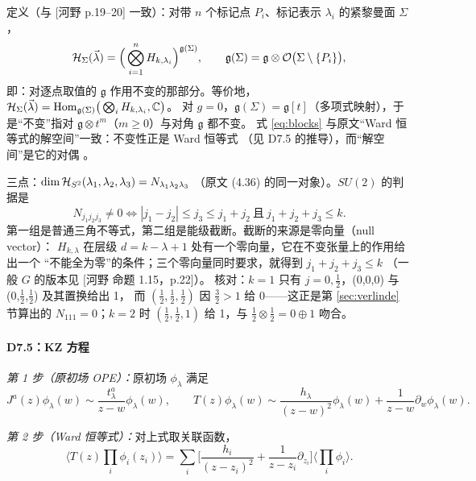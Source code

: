 定义（与 [河野 p.19--20] 一致）：对带 $n$ 个标记点 $P_i$、标记表示 $\lambda_i$ 的紧黎曼面 $\Sigma$，
\begin{equation}
\mathcal{H}_\Sigma(\vec\lambda)
=\Big(\bigotimes_{i=1}^n H_{k,\lambda_i}\Big)^{\mathfrak g(\Sigma)},
\qquad
\mathfrak g(\Sigma)=\mathfrak g\otimes\mathcal{O}\big(\Sigma\setminus\{P_i\}\big),
\label{eq:blocks}
\end{equation}
即：对逐点取值的 $\mathfrak g$ 作用不变的那部分。等价地，
$\mathcal{H}_\Sigma(\vec\lambda)=\mathrm{Hom}_{\mathfrak g(\Sigma)}\big(\bigotimes_iH_{k,\lambda_i},\mathbb{C}\big)$。
对 $g=0$，$\mathfrak g(\Sigma)=\mathfrak g[t]$（多项式映射），于是“不变”指对
$\mathfrak g\otimes t^m$（$m\ge0$）与对角 $\mathfrak g$ 都不变。
式 \eqref{eq:blocks} 与原文“Ward 恒等式的解空间”一致：不变性正是 Ward 恒等式
（见 D7.5 的推导），而“解空间”是它的对偶 \ours。

三点：$\dim\mathcal{H}_{S^2}(\lambda_1,\lambda_2,\lambda_3)=N_{\lambda_1\lambda_2\lambda_3}$
（原文 (4.36) 的同一对象）。$SU(2)$ 的判据是
\begin{equation}
N_{j_1j_2j_3}\ne0
\iff
|j_1-j_2|\le j_3\le j_1+j_2
\ \text{且}\
j_1+j_2+j_3\le k .
\label{eq:threepoint}
\end{equation}
第一组是普通三角不等式，第二组是能级截断。截断的来源是零向量（null vector）：
$H_{k,\lambda}$ 在层级 $d=k-\lambda+1$ 处有一个零向量，它在不变张量上的作用给出一个
“不能全为零”的条件；三个零向量同时要求，就得到 $j_1+j_2+j_3\le k$ \ours
（一般 $G$ 的版本见 [河野 命题 1.15，p.22]）。
核对：$k=1$ 只有 $j=0,\frac12$，(0,0,0) 与 (0,$\frac12$,$\frac12$) 及其置换给出 1，
而 $(\frac12,\frac12,\frac12)$ 因 $\frac32>1$ 给 0——这正是第 \ref{sec:verlinde} 节算出的
$N_{111}=0$；$k=2$ 时 $(\frac12,\frac12,1)$ 给 1，与 $\frac12\otimes\frac12=0\oplus1$ 吻合。

\paragraph{D7.5：KZ 方程}

\emph{第 1 步（原初场 OPE）：}原初场 $\phi_\lambda$ 满足
\begin{equation}
J^a(z)\phi_\lambda(w)\sim\frac{t^a_\lambda}{z-w}\phi_\lambda(w),
\qquad
T(z)\phi_\lambda(w)\sim\frac{h_\lambda}{(z-w)^2}\phi_\lambda(w)+\frac{1}{z-w}\partial_w\phi_\lambda(w).
\end{equation}

\emph{第 2 步（Ward 恒等式）：}对上式取关联函数，
\begin{equation}
\langle T(z)\prod_i\phi_i(z_i)\rangle
=\sum_i\Big[\frac{h_i}{(z-z_i)^2}+\frac{1}{z-z_i}\partial_{z_i}\Big]
\langle\prod_i\phi_i\rangle .
\label{eq:ward}
\end{equation}


